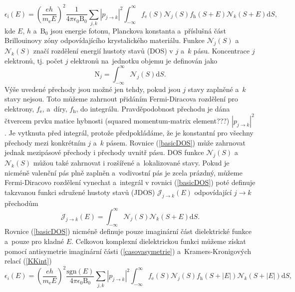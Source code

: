 \begin{equation}
\label{basicDOS}
\epsilon_\mathrm{i} (E) = 
\left(\frac{eh}{m_\mathrm{e}E} \right)^2 \frac{1}{4 \pi \epsilon_0 \mathrm{B}_0} \sum_{j,k} | p_{j \rightarrow k} |^2
\int_{-\infty}^\infty f_\mathrm{e}(S) \mathcal{N}_j(S) f_\mathrm{h}(S+E) \mathcal{N}_k(S + E)\mathrm{d}S \text{,}
\end{equation}
kde $E$, $h$ a~$\mathrm{B}_0$ jsou energie fotonu, Planckova konstanta a~příslušná část Brillouinovy zóny odpovídajícího krystalického materiálu. Funkce $\mathcal{N}_j(S)$ a~$\mathcal{N}_k(S)$ značí rozdělení energií hustoty stavů (DOS) v $j$ a~$k$ pásu. Koncentrace $j$ elektronů, tj. počet $j$ elektronů na~jednotku objemu je definován jako
\begin{equation}
\mathrm{N}_j = \int_{-\infty}^\infty \mathcal{N}_j(S)\mathrm{d}S \text{.}
\end{equation}
Výše uvedené přechody jsou možné jen tehdy, pokud jsou $j$ stavy zaplněné a~$k$ stavy nejsou. Toto můžeme zahrnout přidáním Fermi-Diracova rozdělení pro elektrony, $f_\mathrm{e}$, a~díry, $f_\mathrm{h}$, do integrálu. Pravděpodobnost přechodu je dána čtvercem prvku matice hybnosti (squared momentum-matrix element???) $|p_{j \rightarrow k}|^2$. Je vytknuta před integrál, protože předpokládáme, že je konstantní pro všechny přechody mezi konkrétním $j$ a~$k$ pásem. Rovnice (\ref{basicDOS}) může zahrnovat jednak mezipásové přechody i přechody uvnitř pásu. DOS funkce $\mathcal{N}_j(S)$ a~$\mathcal{N}_k(S)$ můžou také zahrnovat i rozšířené a~lokalizované stavy. Pokud je nicméně valenční pás plně zaplněn a~vodivostní pás je zcela prázdný, můžeme Fermi-Diracovo rozdělení vynechat a~integrál v rovnici (\ref{basicDOS}) poté definuje takzvanou funkci sdružené hustoty stavů (JDOS) $\mathcal{J}_{j \rightarrow k}(E)$ odpovídající $j \rightarrow k$ přechodům
\begin{equation}
\mathcal{J}_{j \rightarrow k}(E) = \int_{-\infty}^\infty \mathcal{N}_j(S) \mathcal{N}_k(S + E)\mathrm{d}S \text{.}
\end{equation}
Rovnice (\ref{basicDOS}) nicméně definuje pouze imaginární část dielektrické funkce a~pouze pro kladné $E$. Celkovou komplexní dielektrickou funkci můžeme získat pomocí antisymetrie imaginární části (\ref{casovasymetrie}) a~Kramers-Kronigových relací (\ref{KKint})
\begin{equation}
\label{basicDLC2}
\epsilon_i (E) = 
\left(\frac{eh}{m_\mathrm{e}E} \right)^2 \frac{\mathrm{sgn}(E)}{4 \pi \epsilon_0 \mathrm{B}_0} \sum_{j,k} | p_{j \rightarrow k} |^2
\int_{-\infty}^\infty f_\mathrm{e}(S) \mathcal{N}_j(S) f_\mathrm{h}(S+|E|) \mathcal{N}_k(S + |E|)\mathrm{d}S \text{,}
\end{equation}

